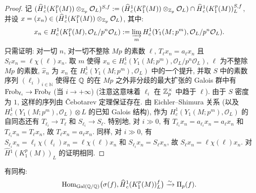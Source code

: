 \begin{proof}
记 $(\widehat{H}{}_{c}^{1}(K_1^{p}(M)) \otimes_{\mathbb{Z}_p} \mathcal{O}_L)^{S,f} := (\widehat{H}{}_{c}^{1}(K_1^{p}(M)) \otimes_{\mathbb{Z}_p} \mathcal{O}_L) \cap \widehat{H}{}_{c}^{1}(K_1^{p}(M))_L^{S,f}$, 并设 $x = (x_n) \in (\widehat{H}{}_{c}^{1}(K_1^{p}(M)) \otimes_{\mathbb{Z}_p} \mathcal{O}_L)$, 其中:
\[
x_n \in H_{c}^{1}(K_1^{p}(M),\mathcal{O}_L/p^{n}\mathcal{O}_L) := \varinjlim_m H_{c}^{1}(Y_1(M;p^{m}),\mathcal{O}_L/p^{n}\mathcal{O}_L).
\]
只需证明: 对一切 $n$, 对一切不整除 $Mp$ 的素数 $\ell$, $T_{\ell}x_n = a_{\ell}x_n$ 且 $S_{\ell}x_n = \ell\chi(\ell)x_n$.
取 $m$ 使得 $x_n \in H_{c}^{1}(Y_1(M;p^{m}),\mathcal{O}_L/p^{n}\mathcal{O}_L)$, $\ell$ 为不整除 $Mp$ 的素数, $\widehat{x}_n$ 为 $x_n$ 在 $H_{c}^{1}(Y_1(M;p^{m}),\mathcal{O}_L)$ 中的一个提升, 并取 $S$ 中的素数序列 $(\ell_i)_{i \in \mathbb{N}}$ 使得在 $\mathbb{Q}$ 的在 $Mp$ 之外非分歧的最大扩张的 Galois 群中有 $\operatorname{Frob}_{\ell_i} \to \operatorname{Frob}_{\ell}$ (当 $i \to +\infty$) (注意这意味着 $\ell_i$ 在 $\mathbb{Z}_p^{\times}$ 中趋于 $\ell$).
由于 $S$ 密度为 $1$, 这样的序列由 \v{C}ebotarev 定理保证存在.
由 Eichler--Shimura 关系 (以及 $H_{c}^{1}(Y_1(M;p^{m}),\mathcal{O}_L) \otimes L$ 的已知 Galois 结构), 作为 $H_{c}^{1}(Y_1(M;p^{m}),\mathcal{O}_L)$ 的自同态还有 $T_{\ell_i} \to T_{\ell}$ 和 $S_{\ell_i} \to S_{\ell}$.
特别地, 对 $i \gg 0$, 有 $T_{\ell_i}x_n = a_{\ell_i}x_n = a_{\ell}x_n$ 和 $T_{\ell_i}x_n = T_{\ell}x_n$, 故 $T_{\ell}x_n = a_{\ell}x_n$.
同样, 对 $i \gg 0$, 有 $S_{\ell_i}x_n = \ell_i\chi(\ell_i)x_n = \ell\chi(\ell)x_n$ 和 $S_{\ell_i}x_n = S_{\ell}x_n$, 故 $S_{\ell}x_n = \ell\chi(\ell)x_n$.
对 $\widehat{H}{}^{1}(K_1^{p}(M))_L$ 的证明相同.
\end{proof}

\begin{proposition}\label{prop:3.2.3}
有同构:
\[
\operatorname{Hom}_{\operatorname{Gal}(\mathbb{Q}/\mathbb{Q})}\bigl(\sigma(f),\widehat{H}{}_{c}^{1}(K_1^{p}(M))_L^{f}\bigr) \xrightarrow{\sim} \Pi_p(f).
\]
\end{proposition}

